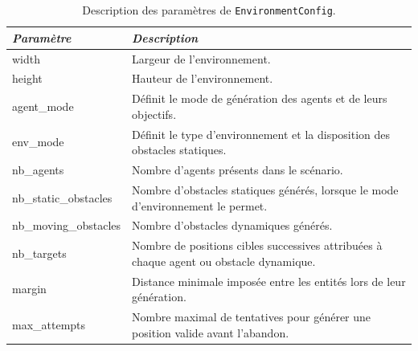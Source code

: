\begin{table}[h]
    \centering
    \caption{Description des paramètres de \texttt{EnvironmentConfig}.}
    \label{tab:environment_parameters}
    \begin{tabularx}{\textwidth}{>{\ttfamily\small}l X}
        \toprule
        \textnormal{\textit{Paramètre}} & \textit{Description}                                                                    \\
        \midrule
        width                           & Largeur de l'environnement.                                                             \\

        height                          & Hauteur de l'environnement.                                                             \\

        agent\_mode                     & Définit le mode de génération des agents et de leurs objectifs.                         \\

        env\_mode                       & Définit le type d'environnement et la disposition des obstacles statiques.              \\

        nb\_agents                      & Nombre d'agents présents dans le scénario.                                              \\

        nb\_static\_obstacles           & Nombre d'obstacles statiques générés, lorsque le mode d'environnement le permet.        \\

        nb\_moving\_obstacles           & Nombre d'obstacles dynamiques générés.                                                  \\

        nb\_targets                     & Nombre de positions cibles successives attribuées à chaque agent ou obstacle dynamique. \\

        margin                          & Distance minimale imposée entre les entités lors de leur génération.                    \\

        max\_attempts                   & Nombre maximal de tentatives pour générer une position valide avant l'abandon.          \\


\end{tabularx}
\end{table}
